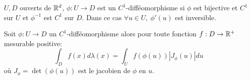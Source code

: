 \begin{rappel}
	$U, D$ ouverts de $\mathbb{R}^d$, $\phi : U \to D$ est un $C^1$-difféomorphisme si $\phi$ est bijective et $C^1$ sur $U$ et $\phi^{-1}$ est $C^1$ sur $D$.
	Dans ce cas $\forall u \in U, \ \phi'(u)$ est inversible.
\end{rappel}


\begin{theorem}
	Soit $\phi: U \to D$ un $C^1$-difféomorphisme alors pour toute fonction $f : D \to \mathbb{R}^+$mesurable positive:
	$$\int_D f(x) d\lambda(x) = \int_U f(\phi(u)) |J_\phi (u)| d u $$
	où $J_\phi =\det(\phi(u))$ est le jacobien de $\phi$ en $u$.
\end{theorem}



